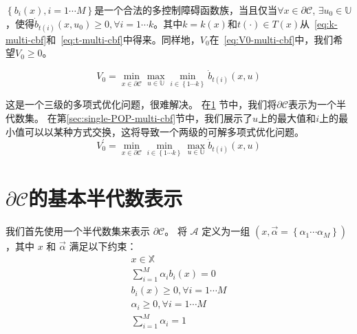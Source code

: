 \begin{definition}[合法的多控制障碍函数族] \label{def:valid-multi-cbf}
 $\left\{ b_i(x),i=1\cdots M \right\} $是一个合法的多控制障碍函数族，当且仅当$\forall x\in \partial \mathcal{C} $, $\exists u_0\in \mathbb{U}$，使得$\dot{b}_{t\left( i \right)}\left( x,u_0 \right) \ge 0,\forall i=1\cdots k$。其中$k=k(x)$和$t(\cdot) \in T(x)$从~\eqref{eq:k-multi-cbf}和~\eqref{eq:t-multi-cbf}中得来。同样地，$V_0$在~\eqref{eq:V0-multi-cbf}中，我们希望$V_0 \ge 0$。
\end{definition}

\begin{equation} \label{eq:V0-multi-cbf}
V_0=\min _{x\in \partial \mathcal{C}}\max _{u\in \mathbb{U}}\min _{i\in \left\{ 1\cdots k \right\}}\dot{b}_{t\left( i \right)}\left( x,u \right) 
\end{equation}

这是一个三级的多项式优化问题，很难解决。 在\ref{sec:semi-C-multi-cbf} 节中，我们将$\partial \mathcal{C}$表示为一个半代数集。 在第\ref{sec:single-POP-multi-cbf}节中，我们展示了$u$上的最大值和$i$上的最小值可以以某种方式交换，这将导致一个两级的可解多项式优化问题。
\begin{equation} \label{eq:V0-prime-multi-cbf}
V_{0}^{'}=\min_{x\in \partial \mathcal{C}} \min_{i\in \left\{ 1\cdots k \right\}} \max_{u\in \mathbb{U}} \dot{b}_{t\left( i \right)}\left( x,u \right) 
\end{equation}

\section{$\partial \mathcal{C}$的基本半代数表示}
\label{sec:semi-C-multi-cbf}
我们首先使用一个半代数集来表示 $\partial \mathcal{C}$。 将 $\mathcal{A}$ 定义为一组 $\left( x,\overrightarrow{\alpha }=\left\{ \alpha _1\cdots \alpha _M \right\} \right)$，其中 $x$ 和 $\overrightarrow{\alpha}$ 满足以下约束：
\begin{eqnarray}
x \in \mathbb{X}\\
\sum_{i=1}^M{\alpha _ib_i\left( x \right)} = 0 \label{eq:x-alpha-zero-eq-multi-cbf}\\    
b_i\left( x \right) \ge 0,\forall i=1\cdots M \label{eq:x-alpha-b-ineq-multi-cbf}\\
\alpha _i \ge 0,\forall i=1\cdots M \label{eq:x-alpha-alpha-ineq-multi-cbf}\\   
\sum_{i=1}^M{\alpha _i} = 1 \label{eq:x-alpha-alpha-sum-multi-cbf}
\end{eqnarray}

